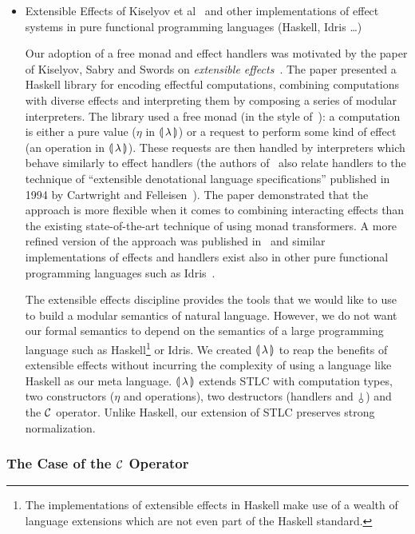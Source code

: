 \begin{itemize}
\item Extensible Effects of Kiselyov et al~\cite{kiselyov2013extensible}
  and other implementations of effect systems in pure functional
  programming languages (Haskell, Idris \ldots)

  Our adoption of a free monad and effect handlers was motivated by the
  paper of Kiselyov, Sabry and Swords on \emph{extensible
    effects}~\cite{kiselyov2013extensible}. The paper presented a Haskell
  library for encoding effectful computations, combining computations with
  diverse effects and interpreting them by composing a series of modular
  interpreters. The library used a free monad (in the style
  of~\cite{swierstra2008data}): a computation is either a pure value
  ($\eta$ in ${\llparenthesis \, \lambda \, \rrparenthesis}$) or a request to perform some kind of effect (an
  operation in ${\llparenthesis \, \lambda \, \rrparenthesis}$). These requests are then handled by interpreters
  which behave similarly to effect handlers (the authors
  of~\cite{kiselyov2013extensible} also relate handlers to the technique of
  ``extensible denotational language specifications'' published in 1994 by
  Cartwright and Felleisen~\cite{cartwright1994extensible}). The paper
  demonstrated that the approach is more flexible when it comes to
  combining interacting effects than the existing state-of-the-art
  technique of using monad transformers. A more refined version of the
  approach was published in~\cite{kiselyov2015freer} and similar
  implementations of effects and handlers exist also in other pure
  functional programming languages such as
  Idris~\cite{brady2013programming}.

  The extensible effects discipline provides the tools that we would like
  to use to build a modular semantics of natural language. However, we do
  not want our formal semantics to depend on the semantics of a large
  programming language such as Haskell\footnote{The implementations of
    extensible effects in Haskell make use of a wealth of language
    extensions which are not even part of the Haskell standard.} or
  Idris. We created ${\llparenthesis \, \lambda \, \rrparenthesis}$ to reap the benefits of extensible effects
  without incurring the complexity of using a language like Haskell as our
  meta language. ${\llparenthesis \, \lambda \, \rrparenthesis}$ extends STLC with computation types, two
  constructors ($\eta$ and operations), two destructors (handlers and
  $\cherry$) and the $\mathcal{C}$ operator. Unlike Haskell, our extension of STLC
  preserves strong normalization.
\end{itemize}


\subsubsection{The Case of the $\mathcal{C}$ Operator}


